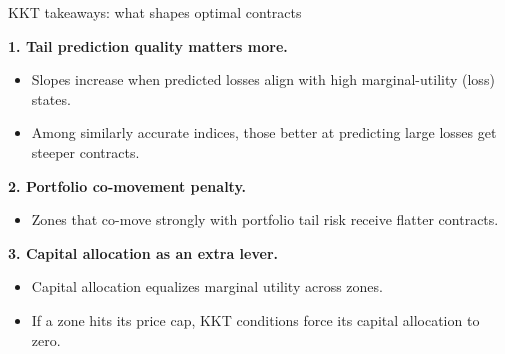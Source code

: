 \documentclass{beamer}
\begin{document}
      \begin{frame}{KKT takeaways: what shapes optimal contracts}
        \small
        
        \textbf{1. Tail prediction quality matters more.}
        \begin{itemize}\itemsep2pt
            \item Slopes increase when predicted losses align with high marginal-utility (loss) states.
            \item Among similarly accurate indices, those better at predicting large losses get steeper contracts.
        \end{itemize}
        
        \medskip
        
        \textbf{2. Portfolio co-movement penalty.}
        \begin{itemize}\itemsep2pt
            \item Zones that co-move strongly with portfolio tail risk receive flatter contracts.
        \end{itemize}
        
        \medskip
        
        \textbf{3. Capital allocation as an extra lever.}
        \begin{itemize}\itemsep2pt
            \item Capital allocation equalizes marginal utility across zones.
            \item If a zone hits its price cap, KKT conditions force its capital allocation to zero.
        \end{itemize}
        
        
        
        \end{frame}
        
\end{document}
